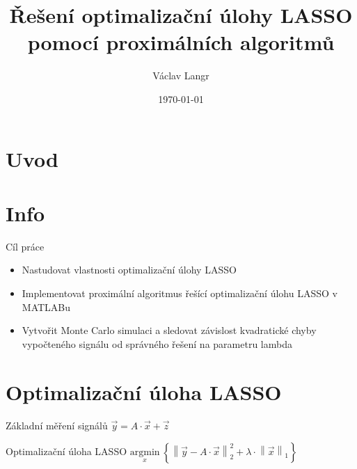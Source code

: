 


\title{Řešení optimalizační úlohy LASSO pomocí proximálních algoritmů}
%
\author{Václav Langr}
% 
\date{\today} %
\newcommand{\TextTitulniStranaPodLinkou}{\tiny
Studentská 2 {\color{FM_TUL} |} 461\,17 Liberec 2 {\color{FM_TUL} |} 
{vaclav.langr@tul.cz} {\color{FM_TUL} |} 
\href{http://www.fm.tul.cz/}{www.fm.tul.cz}}
 
\section{Uvod}
\begin{frame}[plain]
\titlepage
\end{frame}
\section{Info}
\begin{frame}
	\vfill
	\begin{block}{Cíl práce}
    \begin{itemize}
        \item Nastudovat vlastnosti optimalizační úlohy LASSO
        \item Implementovat proximální algoritmus řešící optimalizační úlohu LASSO v MATLABu
        \item Vytvořit Monte Carlo simulaci a sledovat závislost kvadratické chyby vypočteného signálu od správného řešení na parametru lambda
      \end{itemize}
    \end{block}
\end{frame}
\section{Optimalizační úloha LASSO}
\vfill
\begin{frame}
	\vfill
	\begin{block}{Základní měření signálů}
	$\vec{y} = A \cdot \vec{x} + \vec{z}$
	\end{block}
	\begin{block}{Optimalizační úloha LASSO}
		$\underset{x} {\mathrm{argmin}} ~\left\{\left\|\vec{y}-A \cdot \vec{x}\right\| ^2 _2+ \lambda \cdot \left\|\vec{x}\right\|_1\right\}$
	\end{block}
\end{frame}

